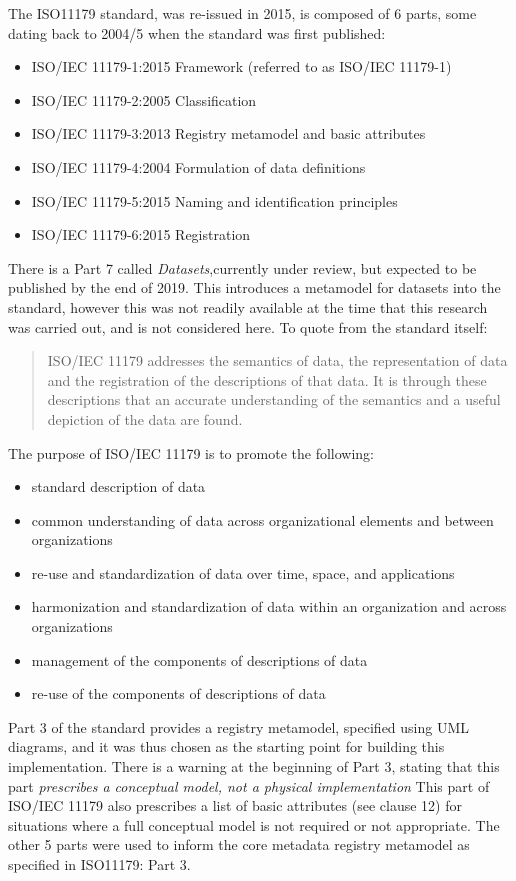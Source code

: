 \documentclass[runningheads]{llncs}
\begin{document}
The ISO11179 \cite{ISO11179} standard, was re-issued in 2015, is composed of 6 parts, some dating back to 2004/5 when the standard was first published:
\begin{itemize}
	\item ISO/IEC 11179-1:2015 Framework (referred to as ISO/IEC 11179-1)
	\item ISO/IEC 11179-2:2005 Classification
	\item ISO/IEC 11179-3:2013 Registry metamodel and basic attributes
	\item ISO/IEC 11179-4:2004 Formulation of data definitions
	\item ISO/IEC 11179-5:2015 Naming and identification principles
	\item ISO/IEC 11179-6:2015 Registration	
\end{itemize}
There is a Part 7 called \emph{Datasets},currently under review, but expected to be published by the end of 2019. This introduces a metamodel for datasets into the standard, however this was not readily available at the time that this research was carried out, and is not considered here. To quote from the standard itself:
\begin{quote}
	ISO/IEC 11179 addresses the semantics of data, the representation of data and the registration of the descriptions of that data. It is through these descriptions that an accurate understanding of the semantics and a useful depiction of the data are found. 
\end{quote}
The purpose of ISO/IEC 11179 is to promote the following:
\begin{itemize}
	\item standard description of data
	\item common understanding of data across organizational elements and between organizations
	\item re-use and standardization of data over time, space, and applications
	\item harmonization and standardization of data within an organization and across organizations
	\item management of the components of descriptions of data
	\item re-use of the components of descriptions of data
\end{itemize}

Part 3 of the standard provides a registry metamodel, specified using UML diagrams, and it was thus chosen as the starting point for building this implementation. There is a warning at the beginning of Part 3, stating that this part \emph{ prescribes a conceptual model, not a physical implementation } This part of ISO/IEC 11179 also prescribes a list of basic attributes (see clause 12) for situations where a full conceptual model is not required or not appropriate. The other 5 parts were used to inform the core metadata registry metamodel as specified in ISO11179: Part 3.
\end{document}
